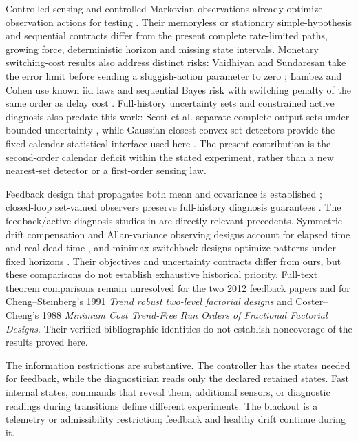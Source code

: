 Controlled sensing and controlled Markovian observations already optimize
observation actions for testing \cite{controlled,markov}. Their memoryless or
stationary simple-hypothesis and sequential contracts differ from the present
complete rate-limited paths, growing force, deterministic horizon and missing
state intervals. Monetary switching-cost results also address distinct risks:
Vaidhiyan and Sundaresan take the error limit before sending a sluggish-action
parameter to zero \cite{switchcost}; Lambez and Cohen use known iid laws and
sequential Bayes risk with switching penalty of the same order as delay cost
\cite{multipleplays}. Full-history uncertainty sets and constrained active diagnosis
also predate this work: Scott et al. separate complete output sets under bounded
uncertainty \cite{zonotope}, while Gaussian closest-convex-set detectors provide
the fixed-calendar statistical interface used here \cite{convex}.
The present contribution is the second-order calendar deficit within the stated
experiment, rather than a new nearest-set detector or a first-order sensing law.

Feedback design that propagates both mean and covariance is established
\cite{kim}; closed-loop set-valued observers preserve full-history diagnosis
guarantees \cite{closedset}. The feedback/active-diagnosis studies in
\cite{feedback2012,robustfeedback2012} are directly relevant precedents.
Symmetric drift compensation and Allan-variance observing designs account for
elapsed time and real dead time \cite{allan,ossenkopf}, and minimax switchback designs
optimize patterns under fixed horizons \cite{switchback}. Their objectives and
uncertainty contracts differ from ours, but these comparisons do not establish
exhaustive historical priority. Full-text theorem comparisons remain unresolved
for the two 2012 feedback papers and for Cheng--Steinberg's 1991
\emph{Trend robust two-level factorial designs} and Coster--Cheng's 1988
\emph{Minimum Cost Trend-Free Run Orders of Fractional Factorial Designs}.
Their verified bibliographic identities do not establish noncoverage of the
results proved here.

The information restrictions are substantive. The controller has the states
needed for feedback, while the diagnostician reads only the declared retained
states. Fast internal states, commands that reveal them, additional sensors,
or diagnostic readings during transitions define different experiments.
The blackout is a telemetry or admissibility restriction; feedback and
healthy drift continue during it.

